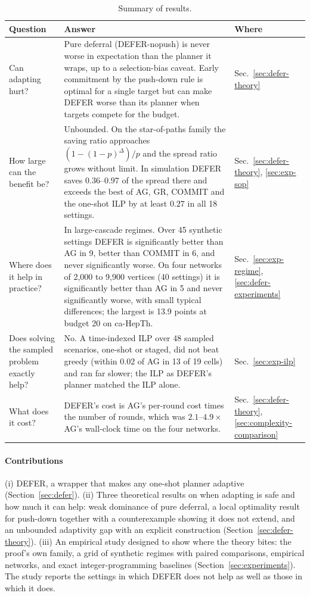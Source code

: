 \documentclass[preprint,11pt]{elsarticle}
\theoremstyle{definition}
\theoremstyle{remark}
\newcommand{\up}{\rule{0pt}{2.6ex}}
\begin{document}
\begin{table}[h]
\centering
\caption{Summary of results.}\label{tab:summary}
\small
\begin{tabular}{@{}p{}p{}p{}@{}}
\hline
\up Question & Answer & Where \\
\hline
\up Can adapting hurt? & Pure deferral (DEFER-nopush) is never worse in expectation than the planner it wraps, up to a selection-bias caveat. Early commitment by the push-down rule is optimal for a single target but can make DEFER worse than its planner when targets compete for the budget. & Sec.~\ref{sec:defer-theory} \\
How large can the benefit be? & Unbounded. On the star-of-paths family the saving ratio approaches $(1-(1-p)^\Delta)/p$ and the spread ratio grows without limit. In simulation DEFER saves $0.36$--$0.97$ of the spread there and exceeds the best of AG, GR, COMMIT and the one-shot ILP by at least $0.27$ in all 18 settings. & Sec.~\ref{sec:defer-theory}, \ref{sec:exp-sop} \\
Where does it help in practice? & In large-cascade regimes. Over 45 synthetic settings DEFER is significantly better than AG in 9, better than COMMIT in 6, and never significantly worse. On four networks of 2,000 to 9,900 vertices (40 settings) it is significantly better than AG in 5 and never significantly worse, with small typical differences; the largest is 13.9 points at budget 20 on ca-HepTh. & Sec.~\ref{sec:exp-regime}, \ref{sec:defer-experiments}\\
Does solving the sampled problem exactly help? & No. A time-indexed ILP over 48 sampled scenarios, one-shot or staged, did not beat greedy (within $0.02$ of AG in 13 of 19 cells) and ran far slower; the ILP as DEFER's planner matched the ILP alone. & Sec.~\ref{sec:exp-ilp} \\
What does it cost? & DEFER's cost is AG's per-round cost times the number of rounds, which was $2.1$--$4.9\times$ AG's wall-clock time on the four networks. & Sec.~\ref{sec:defer-theory}, \ref{sec:complexity-comparison}\\
\hline
\end{tabular}
\end{table}

\paragraph{Contributions} (i) DEFER, a wrapper that makes any one-shot planner adaptive (Section~\ref{sec:defer}). (ii) Three theoretical results on when adapting is safe and how much it can help: weak dominance of pure deferral, a local optimality result for push-down together with a counterexample showing it does not extend, and an unbounded adaptivity gap with an explicit construction (Section~\ref{sec:defer-theory}). (iii) An empirical study designed to show where the theory bites: the proof's own family, a grid of synthetic regimes with paired comparisons, empirical networks, and exact integer-programming baselines (Section~\ref{sec:experiments}). The study reports the settings in which DEFER does not help as well as those in which it does.
\end{document}
